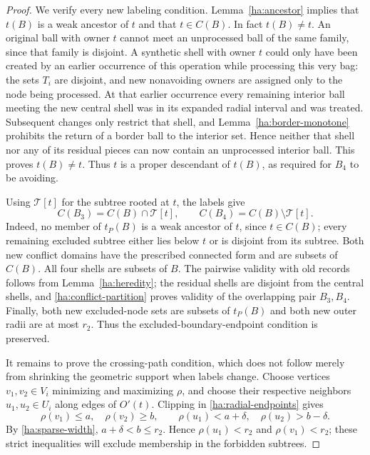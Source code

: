 \begin{proof}
We verify every new labeling condition.  Lemma~\ref{ha:ancestor}
implies that $t(B)$ is a weak ancestor of $t$ and that $t\in C(B)$.
In fact $t(B)\ne t$.  An original ball with owner $t$ cannot meet an
unprocessed ball of the same family, since that family is disjoint.
A synthetic shell with owner $t$ could only have been created by an
earlier occurrence of this operation while processing this very bag:
the sets $T_i$ are disjoint, and new nonavoiding owners are assigned
only to the node being processed.  At that earlier occurrence every
remaining interior ball meeting the new central shell was in its
expanded radial interval and was treated.  Subsequent changes only
restrict that shell, and Lemma~\ref{ha:border-monotone} prohibits the
return of a border ball to the interior set.  Hence neither that shell
nor any of its residual pieces can now contain an unprocessed
interior ball.  This proves $t(B)\ne t$.  Thus $t$ is a proper
descendant of $t(B)$, as required for $B_4$ to be avoiding.

Using $\mathcal T[t]$ for the subtree rooted at $t$, the labels give
\begin{equation}
 C(B_3)=C(B)\cap\mathcal T[t],
 \qquad C(B_4)=C(B)\setminus\mathcal T[t].
 \label{ha:conflict-partition}
\end{equation}
Indeed, no member of $t_P(B)$ is a weak ancestor of $t$, since
$t\in C(B)$; every remaining excluded subtree either lies below $t$
or is disjoint from its subtree.  Both new conflict domains have the
prescribed connected form and are subsets of $C(B)$.  All four shells
are subsets of $B$.  The pairwise validity with old records follows
from Lemma~\ref{ha:heredity}; the residual shells are disjoint from
the central shells, and \eqref{ha:conflict-partition} proves validity
of the overlapping pair $B_3,B_4$.  Finally, both new excluded-node
sets are subsets of $t_P(B)$ and both new outer radii are at most
$r_2$.  Thus the excluded-boundary-endpoint condition is preserved.

It remains to prove the crossing-path condition, which does not follow
merely from shrinking the geometric support when labels change.
Choose vertices $v_1,v_2\in V_i$ minimizing and maximizing $\rho$, and
choose their respective neighbors $u_1,u_2\in U_i$ along edges of
$O'(t)$.  Clipping in \eqref{ha:radial-endpoints} gives
\begin{equation}
 \rho(v_1)\leq a,\quad \rho(v_2)\geq b,
 \qquad \rho(u_1)<a+\delta,\quad \rho(u_2)>b-\delta.
 \label{ha:radial-witnesses}
\end{equation}
By \eqref{ha:sparse-width}, $a+\delta<b\leq r_2$.  Hence
$\rho(u_1)<r_2$ and $\rho(v_1)<r_2$; these strict inequalities will
exclude membership in the forbidden subtrees.


\end{proof}
